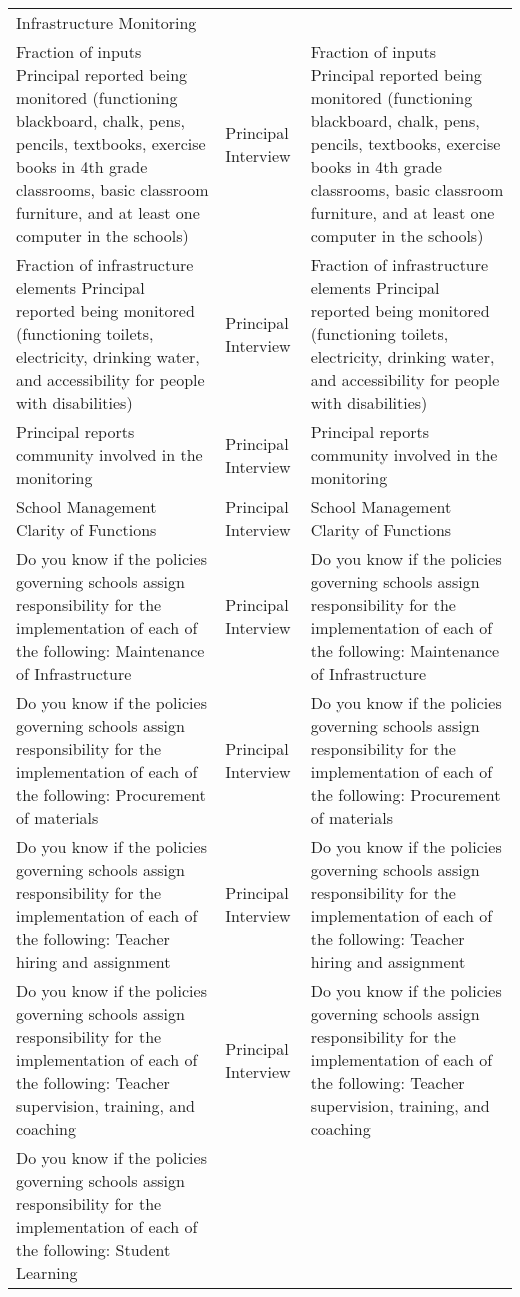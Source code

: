 \documentclass[]{article}
\begin{document}
\begin{longtable}[]{@{}lll@{}}
Infrastructure Monitoring\tabularnewline
Fraction of inputs Principal reported being monitored (functioning
blackboard, chalk, pens, pencils, textbooks, exercise books in 4th grade
classrooms, basic classroom furniture, and at least one computer in the
schools) & Principal Interview & Fraction of inputs Principal reported
being monitored (functioning blackboard, chalk, pens, pencils,
textbooks, exercise books in 4th grade classrooms, basic classroom
furniture, and at least one computer in the schools)\tabularnewline
Fraction of infrastructure elements Principal reported being monitored
(functioning toilets, electricity, drinking water, and accessibility for
people with disabilities) & Principal Interview & Fraction of
infrastructure elements Principal reported being monitored (functioning
toilets, electricity, drinking water, and accessibility for people with
disabilities)\tabularnewline
Principal reports community involved in the monitoring & Principal
Interview & Principal reports community involved in the
monitoring\tabularnewline
School Management Clarity of Functions & Principal Interview & School
Management Clarity of Functions\tabularnewline
Do you know if the policies governing schools assign responsibility for
the implementation of each of the following: Maintenance of
Infrastructure & Principal Interview & Do you know if the policies
governing schools assign responsibility for the implementation of each
of the following: Maintenance of Infrastructure\tabularnewline
Do you know if the policies governing schools assign responsibility for
the implementation of each of the following: Procurement of materials &
Principal Interview & Do you know if the policies governing schools
assign responsibility for the implementation of each of the following:
Procurement of materials\tabularnewline
Do you know if the policies governing schools assign responsibility for
the implementation of each of the following: Teacher hiring and
assignment & Principal Interview & Do you know if the policies governing
schools assign responsibility for the implementation of each of the
following: Teacher hiring and assignment\tabularnewline
Do you know if the policies governing schools assign responsibility for
the implementation of each of the following: Teacher supervision,
training, and coaching & Principal Interview & Do you know if the
policies governing schools assign responsibility for the implementation
of each of the following: Teacher supervision, training, and
coaching\tabularnewline
Do you know if the policies governing schools assign responsibility for
the implementation of each of the following: Student Learning

\end{longtable}
\end{document}
